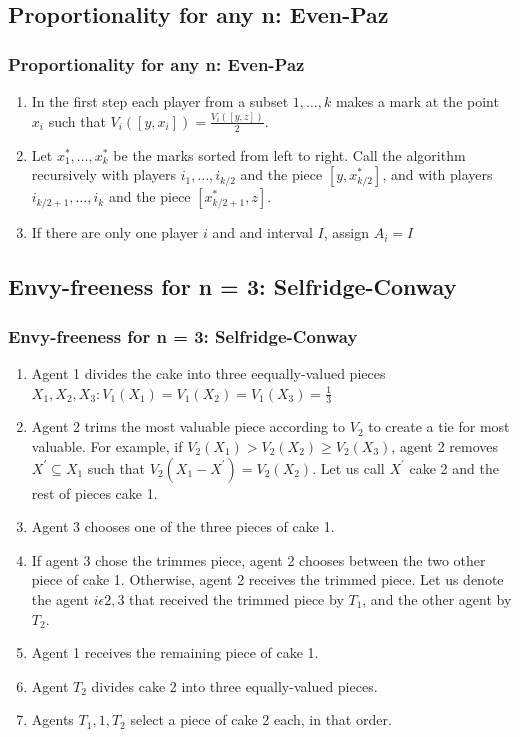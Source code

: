 \documentclass{beamer}
\begin{document}
\subsection{Proportionality for any n: Even-Paz}
\begin{frame}
\frametitle{Proportionality for any n: Even-Paz}
\begin{enumerate}
    \item In the first step each player from a subset ${1,\dots,k}$ makes a mark at the point $x_i$ such that $V_{i}([y,x_i])=\frac{V_{i}([y,z])}{2}$. 
    \item Let $x_1^*,\dots,x_k^*$ be the marks sorted from left to right. Call the algorithm recursively with players $i_{1},\dots,i_{k/2}$ and the piece $[y,x_{k/2}^*]$, and with players $i_{k/2+1},\dots,i_{k}$ and the piece $[x_{k/2+1}^{*},z]$.
    \item If there are only one player $i$ and and interval $I$, assign $A_{i}=I$ 
\end{enumerate}

\end{frame}


\subsection{Envy-freeness for n = 3: Selfridge-Conway}
\begin{frame}
\frametitle{Envy-freeness for n = 3: Selfridge-Conway}
\begin{enumerate}
    \item Agent 1 divides the cake into three eequally-valued pieces $X_1, X_2, X_3: V_1(X_1)=V_1(X_2)=V_1(X_3)=\frac{1}{3}$
    \item Agent 2 trims the most valuable piece according to $V_2$ to create a tie for most valuable. For example, if $V_2(X_1)>V_2(X_2)\geq{V}_2(X_3)$, agent 2 removes $X^{'}\subseteq{X_1}$ such that $V_2(X_1-X^{'})=V_2(X_2)$. Let us call $X^{'}$ cake 2 and the rest of pieces cake 1.
    \item Agent 3 chooses one of the three pieces of cake 1.
    \item If agent 3 chose the trimmes piece, agent 2 chooses between the two other piece of cake 1. Otherwise, agent 2 receives the trimmed piece. Let us denote the agent $i\epsilon{2,3}$ that received the trimmed piece by $T_1$, and the other agent by $T_2$.
    \item Agent 1 receives the remaining piece of cake 1.
    \item Agent $T_2$ divides cake 2 into three equally-valued pieces.
    \item Agents $T_1,1,T_2$ select a piece of cake 2 each, in that order.
\end{enumerate}
\end{frame}
\end{document}
